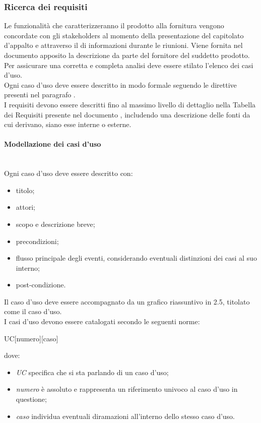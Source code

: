 \subsubsection{Ricerca dei requisiti}
Le funzionalità che caratterizzeranno il prodotto alla fornitura vengono concordate con gli stakeholders al momento della presentazione del capitolato d'appalto e attraverso il  di informazioni durante le riunioni. Viene fornita nel documento apposito \AnalisiDeiRequisiti{} la descrizione da parte del fornitore del suddetto prodotto.\\
Per assicurare una corretta e completa analisi deve essere stilato l'elenco dei casi d'uso.\\
Ogni caso d'uso deve essere descritto in modo formale seguendo le direttive presenti nel paragrafo .\\
I requisiti devono essere descritti fino al massimo livello di dettaglio nella Tabella dei Requisiti presente nel documento \AnalisiDeiRequisiti, includendo una descrizione delle fonti da cui derivano, siano esse interne o esterne.

\paragraph{Modellazione dei casi d'uso}\mbox{}\label{modellazione-casi-uso}\\
Ogni caso d'uso deve essere descritto con:
\begin{itemize}
	\item titolo;
	\item attori;
	\item scopo e descrizione breve;
	\item precondizioni;
	\item flusso principale degli eventi, considerando eventuali distinzioni dei casi al suo interno;
	\item post-condizione.
\end{itemize}
Il caso d'uso deve essere accompagnato da un grafico riassuntivo in  2.5, titolato come il caso d'uso.\\
I casi d'uso devono essere catalogati secondo le seguenti norme:
\begin{center}
	UC[numero][caso]
\end{center}
dove:
\begin{itemize}
	\item \textit{UC} specifica che si sta parlando di un caso d'uso;
	\item \textit{numero} è assoluto e rappresenta un riferimento univoco al caso d'uso in questione;
	\item \textit{caso} individua eventuali diramazioni all'interno dello stesso caso d’uso.
\end{itemize}

